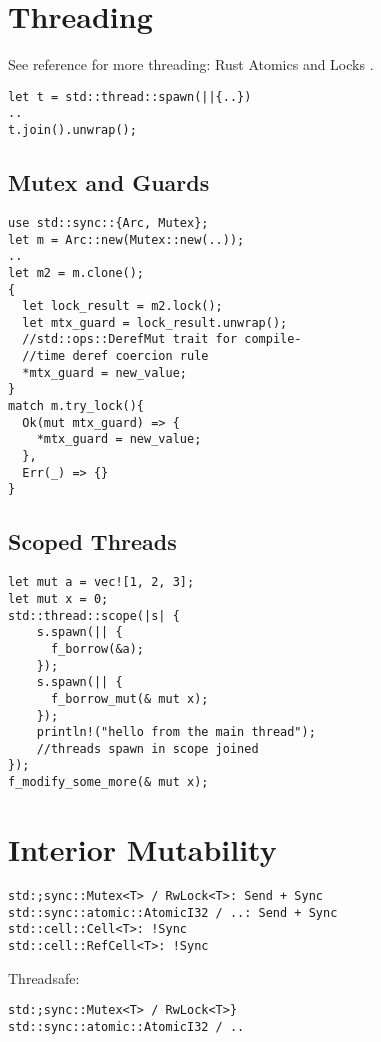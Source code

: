 \documentclass[8pt]{extarticle}
\begin{document}
\begin{multicols*}{2}
  \vfill\null
  \columnbreak

\section{Threading}
See reference for more threading: Rust Atomics and Locks \cite{rustatomicsbook}.
\begin{verbatim}
let t = std::thread::spawn(||{..})
..
t.join().unwrap();
\end{verbatim}

\subsection{Mutex and Guards}
\begin{verbatim}
use std::sync::{Arc, Mutex};
let m = Arc::new(Mutex::new(..));
..
let m2 = m.clone();
{
  let lock_result = m2.lock();
  let mtx_guard = lock_result.unwrap();
  //std::ops::DerefMut trait for compile-
  //time deref coercion rule
  *mtx_guard = new_value;
}
match m.try_lock(){
  Ok(mut mtx_guard) => {
    *mtx_guard = new_value;
  },
  Err(_) => {}
}
\end{verbatim}

\subsection{Scoped Threads}
\begin{verbatim}
let mut a = vec![1, 2, 3];
let mut x = 0;
std::thread::scope(|s| {
    s.spawn(|| {
      f_borrow(&a);
    });
    s.spawn(|| {
      f_borrow_mut(& mut x);
    });
    println!("hello from the main thread");
    //threads spawn in scope joined
});
f_modify_some_more(& mut x);
\end{verbatim}

  \vfill\null
  \columnbreak
  
\section{Interior Mutability}
\begin{verbatim}
std:;sync::Mutex<T> / RwLock<T>: Send + Sync
std::sync::atomic::AtomicI32 / ..: Send + Sync
std::cell::Cell<T>: !Sync
std::cell::RefCell<T>: !Sync
\end{verbatim}

Threadsafe:
\begin{verbatim}
std:;sync::Mutex<T> / RwLock<T>}
std::sync::atomic::AtomicI32 / ..
\end{verbatim}


\end{multicols*}
\end{document}
